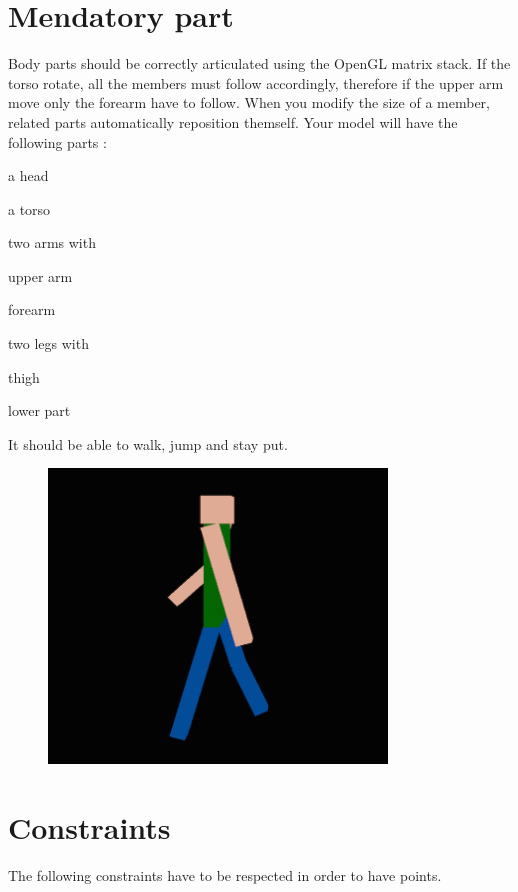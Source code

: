 \documentclass{42-en}
\newenvironment{ft_itemize}
{ \begin{itemize}
	\setlength{\itemsep}{0pt}
	\setlength{\parskip}{0pt}
	\setlength{\parsep}{0pt}     }
{ \end{itemize}                  }
\begin{document}
		\section{Mendatory part}
		Body parts should be correctly articulated using the OpenGL matrix stack. If the torso rotate, all the members must follow accordingly, therefore if the upper arm move only the forearm have to follow. When you modify the size of a member, related parts automatically reposition themself.\newline
		Your model will have the following parts :
		\begin{ft_itemize}
			\item a head
			\item a torso
			\item two arms with
			\begin{ft_itemize}
				\item upper arm
				\item forearm
			\end{ft_itemize}
			\item two legs with
			\begin{ft_itemize}
				\item thigh
				\item lower part
			\end{ft_itemize}
		\end{ft_itemize}
		{
			\noindent
			It should be able to walk, jump and stay put.
		}
		\begin{figure}[ht!]
			\centering
				\includegraphics[width=90mm]{humangl-walking.png}
		\end{figure}
\newpage
	\section{Constraints}
		The following constraints have to be respected in order to have points.
\end{document}
